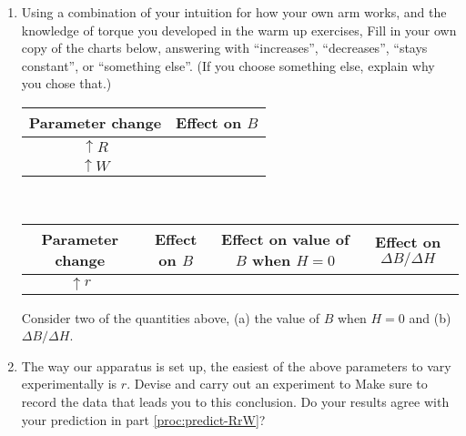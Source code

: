 \begin{enumerate}[labproc]
\item \label{proc:predict-RrW}
Using a combination of your intuition for how your own arm works,
and the knowledge of torque you developed in the warm up exercises,
Fill in your own copy of the charts below, 
answering with ``increases'', ``decreases'', 
``stays constant'', or ``something else''.  
(If you choose something else, explain why you chose that.)
\vspace{.5cm}
\\
\begin{tabular}{|c||c|}
	\hline
	Parameter change & Effect on $B$ 
	\\ \hline \hline
	$\uparrow R$ 
	& %
	\\ \hline
	$\uparrow W$ 
	& %
	\\ \hline
\end{tabular}\\
\vspace{1cm}
\begin{tabular}{|c||c|c|c|}
	\hline
	Parameter change & Effect on $B$ 
	& Effect on value of $B$ when $H=0$
	& Effect on $\Delta B/\Delta H$ 
	\\ \hline \hline
	$\uparrow r$ 
	& & & 
	\\ \hline
\end{tabular}

Consider two of the quantities above, 
(a) the value of $B$ when $H=0$ 
and (b) $\Delta B/\Delta H$.


\item
The way our apparatus is set up, 
the easiest of the above parameters to vary experimentally is $r$.
Devise and carry out an experiment to 
Make sure to record the data that leads you to this conclusion.
Do your results agree with your prediction 
in part \ref{proc:predict-RrW}?


\end{enumerate}
